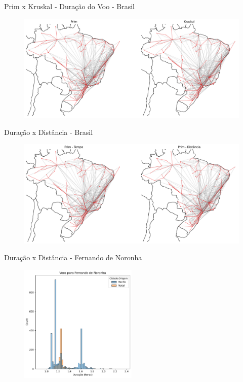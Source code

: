 \documentclass[aspectratio=169,usenames,dvipsnames]{beamer}
\begin{document}
\begin{frame}{Prim x Kruskal - Duração do Voo - Brasil}
    \begin{figure}[ht]
        \centering
        \includegraphics[width=\textwidth]{figs/brasil_time_mst_1.pdf}
    \end{figure}
\end{frame}

\begin{frame}{Duração x Distância - Brasil}
    \begin{figure}[ht]
        \centering
        \includegraphics[width=\textwidth]{figs/brasil_time_x_distance_mst_1.pdf}
    \end{figure}
\end{frame}

\begin{frame}{Duração x Distância - Fernando de Noronha}
    \begin{figure}[ht]
        \centering
        \includegraphics[width=0.5\textwidth]{figs/histograma_fernando_noronha.pdf}
    \end{figure}
\end{frame}
\end{document}
